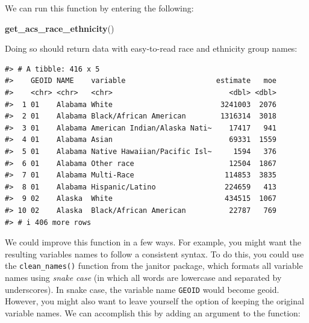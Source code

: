 \documentclass[
]{book}
\newenvironment{Shaded}{\begin{snugshade}}{\end{snugshade}}
\newcommand{\FunctionTok}[1]{\textcolor[rgb]{0.13,0.29,0.53}{\textbf{#1}}}
\newcommand{\NormalTok}[1]{#1}
\begin{document}
We can run this function by entering the following:

\begin{Shaded}
\begin{Highlighting}[]
\FunctionTok{get\_acs\_race\_ethnicity}\NormalTok{()}
\end{Highlighting}
\end{Shaded}

Doing so should return data with easy-to-read race and ethnicity group names:

\begin{verbatim}
#> # A tibble: 416 x 5
#>    GEOID NAME    variable                     estimate   moe
#>    <chr> <chr>   <chr>                           <dbl> <dbl>
#>  1 01    Alabama White                         3241003  2076
#>  2 01    Alabama Black/African American        1316314  3018
#>  3 01    Alabama American Indian/Alaska Nati~    17417   941
#>  4 01    Alabama Asian                           69331  1559
#>  5 01    Alabama Native Hawaiian/Pacific Isl~     1594   376
#>  6 01    Alabama Other race                      12504  1867
#>  7 01    Alabama Multi-Race                     114853  3835
#>  8 01    Alabama Hispanic/Latino                224659   413
#>  9 02    Alaska  White                          434515  1067
#> 10 02    Alaska  Black/African American          22787   769
#> # i 406 more rows
\end{verbatim}

We could improve this function in a few ways. For example, you might want the resulting variables names to follow a consistent syntax. To do this, you could use the \texttt{clean\_names()} function from the janitor package, which formats all variable names using \emph{snake case} (in which all words are lowercase and separated by underscores). In snake case, the variable name \texttt{GEOID} would become geoid. However, you might also want to leave yourself the option of keeping the original variable names. We can accomplish this by adding an argument to the function:
\end{document}
